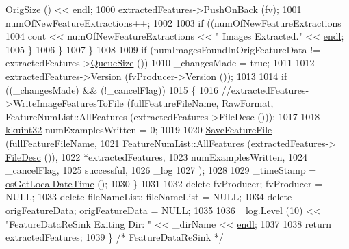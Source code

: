 \begin{DoxyCode}
      \hyperlink{class_k_k_m_l_l_1_1_feature_vector_a5ea23a16266bc34a289824042a836c06}{OrigSize} () << \hyperlink{namespace_k_k_b_ad1f50f65af6adc8fa9e6f62d007818a8}{endl};
1000         extractedFeatures->\hyperlink{class_k_k_m_l_l_1_1_feature_vector_list_abd43779a90a6aa3db1de8092be877bdb}{PushOnBack} (fv);
1001         numOfNewFeatureExtractions++;
1002 
1003         \textcolor{keywordflow}{if}  ((numOfNewFeatureExtractions %
1004           cout << numOfNewFeatureExtractions << \textcolor{stringliteral}{" Images Extracted."} << \hyperlink{namespace_k_k_b_ad1f50f65af6adc8fa9e6f62d007818a8}{endl};
1005       \}
1006     \}
1007   \}
1008 
1009   \textcolor{keywordflow}{if}  (numImagesFoundInOrigFeatureData != extractedFeatures->\hyperlink{class_k_k_b_1_1_k_k_queue_a1dab601f75ee6a65d97f02bddf71c40d}{QueueSize} ())
1010     \_changesMade = \textcolor{keyword}{true};
1011   
1012   extractedFeatures->\hyperlink{class_k_k_m_l_l_1_1_feature_vector_list_a01b3c7a97f5b58639c8aee826fa15dc9}{Version} (fvProducer->\hyperlink{class_k_k_m_l_l_1_1_feature_vector_producer_a8e2f54e185b2fb5de854d9978b4fbac8}{Version} ());
1013 
1014   \textcolor{keywordflow}{if}  ((\_changesMade)  &&  (!\_cancelFlag))
1015   \{
1016     \textcolor{comment}{//extractedFeatures->WriteImageFeaturesToFile (fullFeatureFileName, RawFormat,
       FeatureNumList::AllFeatures (extractedFeatures->FileDesc ()));}
1017 
1018     \hyperlink{namespace_k_k_b_af8d832f05c54994a1cce25bd5743e19a}{kkuint32}  numExamplesWritten = 0;
1019 
1020     \hyperlink{class_k_k_m_l_l_1_1_feature_file_i_o_ab4ad6c5a641f1f8f7c72c1be98bc1da8}{SaveFeatureFile} (fullFeatureFileName,  
1021                      \hyperlink{class_k_k_m_l_l_1_1_feature_num_list_a90cdbdaaa9bff280cb23c6e3f4cec29d}{FeatureNumList::AllFeatures} (extractedFeatures->
      \hyperlink{class_k_k_m_l_l_1_1_feature_vector_list_a736923be9c4ac7553a5aa87dd24efd16}{FileDesc} ()),
1022                      *extractedFeatures,
1023                      numExamplesWritten,
1024                      \_cancelFlag,
1025                      successful,
1026                      \_log
1027                     );
1028 
1029     \_timeStamp = \hyperlink{namespace_k_k_b_af54c205cde0465bcb2c74f3881a96413}{osGetLocalDateTime} ();
1030   \}
1031 
1032   \textcolor{keyword}{delete} fvProducer;       fvProducer      = NULL;
1033   \textcolor{keyword}{delete} fileNameList;     fileNameList    = NULL;
1034   \textcolor{keyword}{delete} origFeatureData;  origFeatureData = NULL;
1035 
1036   \_log.\hyperlink{class_k_k_b_1_1_run_log_a32cf761d7f2e747465fd80533fdbb659}{Level} (10) << \textcolor{stringliteral}{"FeatureDataReSink  Exiting  Dir: "}  << \_dirName << 
      \hyperlink{namespace_k_k_b_ad1f50f65af6adc8fa9e6f62d007818a8}{endl};
1037 
1038   \textcolor{keywordflow}{return}  extractedFeatures;
1039 \}  \textcolor{comment}{/* FeatureDataReSink */}
\end{DoxyCode}
